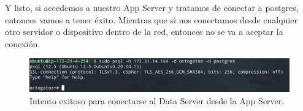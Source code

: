 \documentclass{article}
\begin{document}
Y listo, si accedemos a nuestro App Server y tratamos de 
conectar a postgres, entonces vamos a tener éxito. Mientras
que si nos conectamos desde cualquier otro servidor o 
dispositivo dentro de la red, entonces no se va a aceptar la 
conexión.

\begin{figure}[H]
  \centering
  \includegraphics[width=\textwidth]{DATASERVER/exhibitL}
  \caption{Intento exitoso para conectarse al Data Server desde la App Server.}
  \label{fig:DATASERVER-L}
\end{figure}
\end{document}
